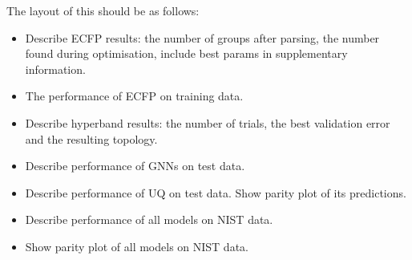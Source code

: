 The layout of this should be as follows:
\begin{itemize}
    \item Describe ECFP results: the number of groups after parsing, the number found during optimisation, include best params in supplementary information.
    \item The performance of ECFP on training data.
    \item Describe hyperband results: the number of trials, the best validation error and the resulting topology.
    \item Describe performance of GNNs on test data.
    \item Describe performance of UQ on test data. Show parity plot of its predictions.
    \item Describe performance of all models on NIST data.
    \item Show parity plot of all models on NIST data.
\end{itemize}